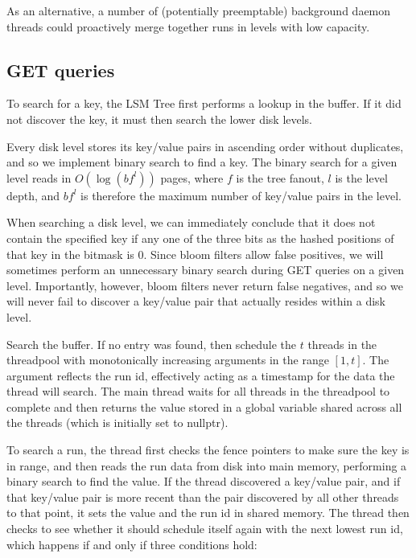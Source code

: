 \documentclass{acm}
\begin{document}
As an alternative, a number of (potentially preemptable) background daemon threads could proactively merge together runs in levels with low capacity.

\subsection{GET queries}


To search for a key, the LSM Tree first performs a lookup in the buffer. If it did not discover the key, it must then search the lower disk levels. 


Every disk level stores its key/value pairs in ascending order without duplicates, and so we implement binary search to find a key. The binary search for a given level reads in $O(\log(bf^l))$ pages, where $f$ is the tree fanout, $l$ is the level depth, and $bf^l$ is therefore the maximum number of key/value pairs in the level.

When searching a disk level, we can immediately conclude that it does not contain the specified key if any one of the three bits as the hashed positions of that key in the bitmask is 0. Since bloom filters allow false positives, we will sometimes perform an unnecessary binary search during GET queries on a given level. Importantly, however, bloom filters never return false negatives, and so we will never fail to discover a key/value pair that actually resides within a disk level.

Search the buffer. If no entry was found, then schedule the $t$ threads in the threadpool with monotonically increasing arguments in the range $[1, t]$. The argument reflects the run id, effectively acting as a timestamp for the data the thread will search. The main thread waits for all threads in the threadpool to complete and then returns the value stored in a global variable shared across all the threads (which is initially set to nullptr).

To search a run, the thread first checks the fence pointers to make sure the key is in range, and then reads the run data from disk into main memory, performing a binary search to find the value. If the thread discovered a key/value pair, and if that key/value pair is more recent than the pair discovered by all other threads to that point, it sets the value and the run id in shared memory. The thread then checks to see whether it should schedule itself again with the next lowest run id, which happens if and only if three conditions hold:
\end{document}
